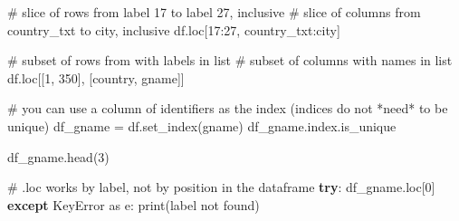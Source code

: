 \documentclass[
  letterpaper,
  DIV=11,
  numbers=noendperiod]{scrreprt}
\newenvironment{Shaded}{\begin{snugshade}}{\end{snugshade}}
\newcommand{\BuiltInTok}[1]{\textcolor[rgb]{0.00,0.23,0.31}{#1}}
\newcommand{\CommentTok}[1]{\textcolor[rgb]{0.37,0.37,0.37}{#1}}
\newcommand{\ControlFlowTok}[1]{\textcolor[rgb]{0.00,0.23,0.31}{\textbf{#1}}}
\newcommand{\DecValTok}[1]{\textcolor[rgb]{0.68,0.00,0.00}{#1}}
\newcommand{\ImportTok}[1]{\textcolor[rgb]{0.00,0.46,0.62}{#1}}
\newcommand{\NormalTok}[1]{\textcolor[rgb]{0.00,0.23,0.31}{#1}}
\newcommand{\OperatorTok}[1]{\textcolor[rgb]{0.37,0.37,0.37}{#1}}
\newcommand{\PreprocessorTok}[1]{\textcolor[rgb]{0.68,0.00,0.00}{#1}}
\newcommand{\StringTok}[1]{\textcolor[rgb]{0.13,0.47,0.30}{#1}}
\begin{document}
\begin{Shaded}
\begin{Highlighting}[]
\CommentTok{\# slice of rows from label 17 to label 27, inclusive}
\CommentTok{\# slice of columns from country\_txt to city, inclusive}
\NormalTok{df.loc[}\DecValTok{17}\NormalTok{:}\DecValTok{27}\NormalTok{, }\StringTok{\textquotesingle{}country\_txt\textquotesingle{}}\NormalTok{:}\StringTok{\textquotesingle{}city\textquotesingle{}}\NormalTok{]}
\end{Highlighting}
\end{Shaded}

\begin{Shaded}
\begin{Highlighting}[]
\CommentTok{\# subset of rows from with labels in list}
\CommentTok{\# subset of columns with names in list}
\NormalTok{df.loc[[}\DecValTok{1}\NormalTok{, }\DecValTok{350}\NormalTok{], [}\StringTok{\textquotesingle{}country\textquotesingle{}}\NormalTok{, }\StringTok{\textquotesingle{}gname\textquotesingle{}}\NormalTok{]]}
\end{Highlighting}
\end{Shaded}

\begin{Shaded}
\begin{Highlighting}[]
\CommentTok{\# you can use a column of identifiers as the index (indices do not *need* to be unique)}
\NormalTok{df\_gname }\OperatorTok{=}\NormalTok{ df.set\_index(}\StringTok{\textquotesingle{}gname\textquotesingle{}}\NormalTok{)}
\NormalTok{df\_gname.index.is\_unique}
\end{Highlighting}
\end{Shaded}

\begin{Shaded}
\begin{Highlighting}[]
\NormalTok{df\_gname.head(}\DecValTok{3}\NormalTok{)}
\end{Highlighting}
\end{Shaded}

\begin{Shaded}
\begin{Highlighting}[]
\CommentTok{\# .loc works by label, not by position in the dataframe}
\ControlFlowTok{try}\NormalTok{:}
\NormalTok{    df\_gname.loc[}\DecValTok{0}\NormalTok{]}
\ControlFlowTok{except} \PreprocessorTok{KeyError} \ImportTok{as}\NormalTok{ e:}
    \BuiltInTok{print}\NormalTok{(}\StringTok{\textquotesingle{}label not found\textquotesingle{}}\NormalTok{)}
\end{Highlighting}
\end{Shaded}
\end{document}
